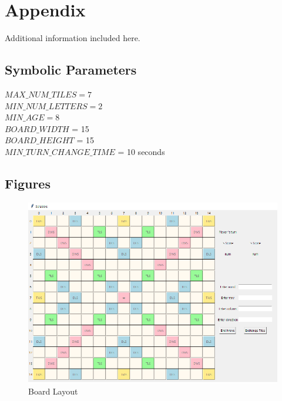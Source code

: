 \documentclass[12pt, titlepage]{article}
\begin{document}




\newpage

\section{Appendix}

Additional information included here.

\subsection{Symbolic Parameters}
$MAX\_NUM\_TILES= 7$\\
$MIN\_NUM\_LETTERS = 2$\\
$MIN\_AGE = 8$\\
$BOARD\_WIDTH$ = 15\\
$BOARD\_HEIGHT$ = 15\\
$MIN\_TURN\_CHANGE\_TIME$ = 10 seconds\\

\subsection{Figures}

\begin{figure}[h]
    \centering
    \includegraphics{TestPlan/Scrabble Board.png}
    \caption{Board Layout}
    \label{fig:my_label}
\end{figure}
\end{document}
